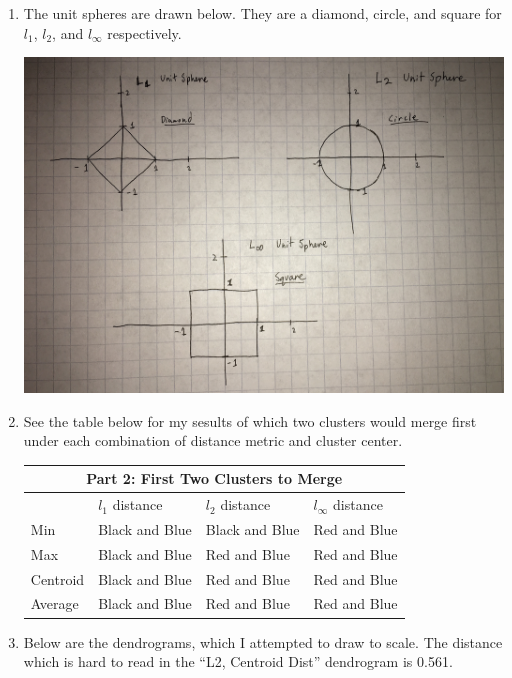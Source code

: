 \documentclass[submit]{harvardml}
\begin{document}
\begin{enumerate}
\item The unit spheres are drawn below. They are a diamond, circle, and square for $l_1$, $l_2$, and $l_\infty$ respectively.

\begin{center}
\includegraphics[scale=0.1]{spheres}
\end{center}
\item See the table below for my sesults of which two clusters would merge first under each combination of distance metric and cluster center.

\begin{tabular}{ |p{3cm}||p{3cm}|p{3cm}|p{3cm}|  }
 \hline
 \multicolumn{4}{|c|}{Part 2: First Two Clusters to Merge} \\
 \hline
 & $l_1$ distance & $l_2$ distance & $l_{\infty}$ distance\\
 \hline
 Min & Black and Blue    & Black and Blue &   Red and Blue \\
 Max &   Black and Blue  & Red and Blue   & Red and Blue \\
 Centroid & Black and Blue & Red and Blue &   Red and Blue \\
 Average   & Black and Blue & Red and Blue &  Red and Blue \\
 \hline
\end{tabular}

\item Below are the dendrograms, which I attempted to draw to scale. The distance which is hard to read in the ``L2, Centroid Dist'' dendrogram is 0.561.


\end{enumerate}
\end{document}
